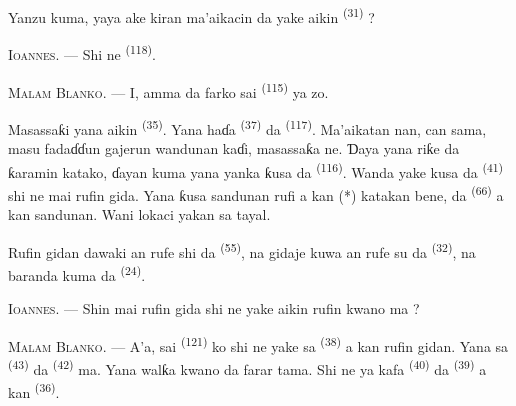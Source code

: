Yanzu kuma, yaya ake kiran ma’aikacin da yake aikin 
\textsuperscript{(31)} ?

\textsc{Ioannes}. --- Shi ne 
\textsuperscript{(118)}.

\VUsaut{3.0mm}
\VUsaut{3.0mm}

\textsc{Malam Blanko}. --- I, amma da farko sai 
\textsuperscript{(115)} ya zo.

Masassaƙi yana aikin  \textsuperscript{(35)}. Yana
haɗa  \textsuperscript{(37)} da 
\textsuperscript{(117)}. Ma’aikatan nan, can sama, masu fadaɗɗun
gajerun wandunan kaɗi, masassaƙa ne. Ɗaya yana riƙe da ƙaramin
katako, ɗayan kuma yana yanka ƙusa da 
\textsuperscript{(116)}. Wanda yake kusa da 
\textsuperscript{(41)} shi ne mai rufin gida. Yana ƙusa sandunan rufi a
kan (*) katakan bene, da  \textsuperscript{(66)} a
kan sandunan. Wani lokaci yakan sa tayal.


Rufin gidan dawaki an rufe shi da  \textsuperscript{(55)},
na gidaje kuwa an rufe su da 
\textsuperscript{(32)}, na baranda kuma da 
\textsuperscript{(24)}.

\textsc{Ioannes}. --- Shin mai rufin gida shi ne yake aikin rufin
kwano ma ?

\textsc{Malam Blanko}. --- A’a, sai 
\textsuperscript{(121)} ko  shi ne yake sa
 \textsuperscript{(38)} a kan rufin gidan. Yana sa
 \textsuperscript{(43)} da 
\textsuperscript{(42)} ma. Yana walƙa kwano da farar tama. Shi ne ya
kafa  \textsuperscript{(40)} da  \textsuperscript{(39)} a kan 
\textsuperscript{(36)}.

